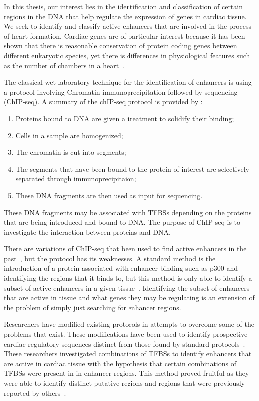 

In this thesis, our interest lies in the identification and classification of certain regions in the DNA that help regulate the expression of genes in cardiac tissue. We seek to identify and classify active enhancers that are involved in the process of heart formation. Cardiac genes are of particular interest because it has been shown that there is reasonable conservation of protein coding genes between different eukaryotic species, yet there is differences in physiological features such as the number of chambers in a heart~\cite{harvey1996nk}. %

The classical wet laboratory technique for the identification of enhancers is using a protocol involving Chromatin immunoprecipitation followed by sequencing (ChIP-seq). A summary of the chIP-seq protocol is provided by \cite{collas2010current}:
    \begin{enumerate}
        \item Proteins bound to DNA are given a treatment to solidify their binding;
        \item Cells in a sample are homogenized;
        \item The chromatin is cut into segments;
        \item The segments that have been bound to the protein of interest are selectively separated through immunoprecipitaion;
        \item These DNA fragments are then used as input for sequencing.
    \end{enumerate}
These DNA fragments may be associated with TFBSs depending on the proteins that are being introduced and bound to DNA. The purpose of ChIP-seq is to investigate the interaction between proteins and DNA.

There are variations of ChIP-seq that been used to find active enhancers in the past~\cite{visel2009chip}, but the protocol has its weaknesses. A standard method is the introduction of a protein associated with enhancer binding such as p300 and identifying the regions that it binds to, but this method is only able to identify a subset of active enhancers in a given tissue~\cite{heintzman2007distinct}. Identifying the subset of enhancers that are active in tissue and what genes they may be regulating is an extension of the problem of simply just searching for enhancer regions.

Researchers have modified existing protocols in attempts to overcome some of the problems that exist. These modifications have been used to identify prospective cardiac regulatory sequences distinct from those found by standard protocols~\cite{he2011co}. These researchers investigated combinations of TFBSs to identify enhancers that are active in cardiac tissue with the hypothesis that certain combinations of TFBSs were present in in enhancer regions. This method proved fruitful as they were able to identify distinct putative regions and regions that were previously reported by others~\cite{blow2010chip}.%

